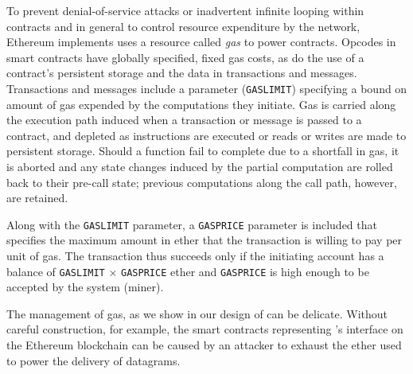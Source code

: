To prevent denial-of-service attacks or inadvertent infinite looping within contracts and in general to control resource expenditure by the network, Ethereum implements uses a resource called \emph{gas} to power contracts. Opcodes in smart contracts have globally specified, fixed gas costs, as do the use of a contract's persistent storage and the data in transactions and messages. Transactions and messages include a parameter (\texttt{GASLIMIT}) specifying a bound on amount of gas expended by the computations they initiate. Gas is carried along the execution path induced when a transaction or message is passed to a contract, and depleted as instructions are executed or reads or writes are made to persistent storage. Should a function fail to complete due to a shortfall in gas, it is aborted and any state changes induced by the partial computation are rolled back to their pre-call state; previous computations along the call path, however, are retained. 

Along with the \texttt{GASLIMIT} parameter, a \texttt{GASPRICE} parameter is included that specifies the maximum amount in ether that the transaction is willing to pay per unit of gas. The transaction thus succeeds only if the initiating account has a balance of \texttt{GASLIMIT} $\times$ \texttt{GASPRICE} ether and \texttt{GASPRICE} is high enough to be accepted by the system (miner). 

The management of gas, as we show in our design of \tcs can be delicate. Without careful construction, for example, the smart contracts representing \tc's interface on the Ethereum blockchain can be caused by an attacker to exhaust the ether used to power the delivery of datagrams. 




